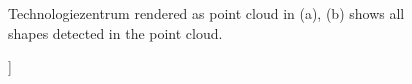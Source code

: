 \begin{figure}
\centering
{}
\caption[[Rendering of the Technologiezentrum in (a), rendering of the detected shapes in (b)]]
{Technologiezentrum rendered as point cloud in (a), (b) shows all shapes detected in the point cloud. }
\label{fig:technologiezentrum_results}
\end{figure}

